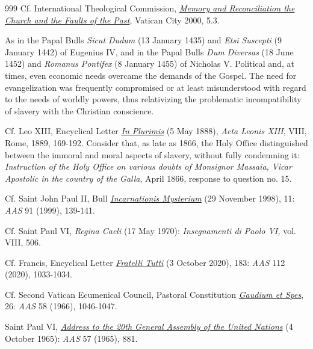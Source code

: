 \documentclass{article}
\begin{document}
\begin{thebibliography}{999}
 Cf. International Theological Commission, \href{https://www.vatican.va/roman_curia/congregations/cfaith/cti_documents/rc_con_cfaith_doc_20000307_memory-reconc-itc_en.html}{\emph{Memory and Reconciliation the Church and the Faults of the Past}}, Vatican City 2000, 5.3.

 As in the Papal Bulls \emph{Sicut Dudum} (13 January 1435) and \emph{Etsi Suscepti} (9 January 1442) of Eugenius IV, and in the Papal Bulls \emph{Dum Diversas} (18 June 1452) and \emph{Romanus Pontifex} (8 January 1455) of Nicholas V. Political and, at times, even economic needs overcame the demands of the Gospel. The need for evangelization was frequently compromised or at least misunderstood with regard to the needs of worldly powers, thus relativizing the problematic incompatibility of slavery with the Christian conscience.

 Cf. Leo XIII, Encyclical Letter \href{https://www.vatican.va/content/leo-xiii/en/encyclicals/documents/hf_l-xiii_enc_05051888_in-plurimis.html}{\emph{In Plurimis}} (5 May 1888), \emph{Acta Leonis XIII}, VIII, Rome, 1889, 169-192. Consider that, as late as 1866, the Holy Office distinguished between the immoral and moral aspects of slavery, without fully condemning it: \emph{Instruction of the Holy Office on various doubts of Monsignor Massaia, Vicar Apostolic in the country of the Galla}, April 1866, response to question no. 15.

 Cf. Saint John Paul II, Bull \href{https://www.vatican.va/jubilee_2000/docs/documents/hf_jp-ii_doc_30111998_bolla-jubilee_en.html}{\emph{Incarnationis Mysterium}} (29 November 1998), 11: \emph{AAS} 91 (1999), 139-141.

 Cf. Saint Paul VI, \emph{Regina Caeli} (17 May 1970): \emph{Insegnamenti di Paolo VI,} vol. VIII, 506.

 Cf. Francis, Encyclical Letter \href{https://www.vatican.va/content/francesco/en/encyclicals/documents/papa-francesco_20201003_enciclica-fratelli-tutti.html}{\emph{Fratelli Tutti}} (3 October 2020), 183: \emph{AAS} 112 (2020), 1033-1034.

 Cf. Second Vatican Ecumenical Council, Pastoral Constitution \href{https://www.vatican.va/archive/hist_councils/ii_vatican_council/documents/vat-ii_const_19651207_gaudium-et-spes_en.html}{\emph{Gaudium et Spes}}, 26: \emph{AAS} 58 (1966), 1046-1047.

 Saint Paul VI, \href{https://www.vatican.va/content/paul-vi/en/speeches/1965/documents/hf_p-vi_spe_19651004_united-nations.html}{\emph{Address to the 20th General Assembly of the United Nations}} (4 October 1965): \emph{AAS} 57 (1965), 881.


\end{thebibliography}
\end{document}
